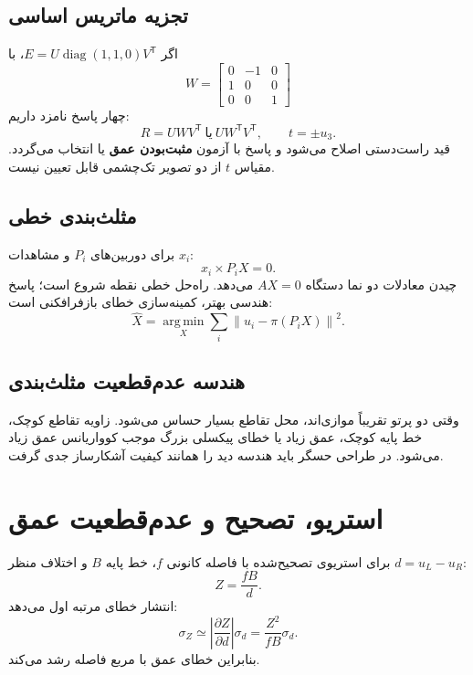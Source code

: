 \documentclass[12pt,openany,oneside]{book}
\newcommand{\norm}[1]{\left\lVert #1\right\rVert}
\newcommand{\trans}{^{\mathsf T}}
\newcommand{\argmin}{\operatorname*{arg\,min}}
\newcommand{\diag}{\operatorname{diag}}
\begin{document}
\subsection{تجزیه ماتریس اساسی}
اگر \(E=U\diag(1,1,0)V\trans\)، با
\begin{equation}
W=\begin{bmatrix}0&-1&0\\1&0&0\\0&0&1\end{bmatrix}
\end{equation}
چهار پاسخ نامزد داریم:
\begin{equation}
R=UWV\trans\ \text{یا}\ UW\trans V\trans,
\qquad
 t=\pm u_3.
\end{equation}
قید راست‌دستی اصلاح می‌شود و پاسخ با آزمون \textbf{مثبت‌بودن عمق} یا  انتخاب می‌گردد.
مقیاس \(t\) از دو تصویر تک‌چشمی قابل تعیین نیست.

\subsection{مثلث‌بندی خطی}
برای دوربین‌های \(P_i\) و مشاهدات \(x_i\):
\begin{equation}
x_i\times P_iX=0.
\end{equation}
چیدن معادلات دو نما دستگاه \(AX=0\) می‌دهد. راه‌حل خطی نقطه شروع است؛ پاسخ هندسی بهتر، کمینه‌سازی خطای بازفرافکنی است:
\begin{equation}
\widehat X=\argmin_X\sum_i\norm{u_i-\pi(P_iX)}^2.
\end{equation}

\subsection{هندسه عدم‌قطعیت مثلث‌بندی}
وقتی دو پرتو تقریباً موازی‌اند، محل تقاطع بسیار حساس می‌شود. زاویه تقاطع کوچک، خط پایه کوچک، عمق زیاد یا خطای پیکسلی
بزرگ موجب کوواریانس عمق زیاد می‌شود. در طراحی حسگر باید هندسه دید را همانند کیفیت آشکارساز جدی گرفت.

\section{استریو، تصحیح و عدم‌قطعیت عمق}

برای استریوی تصحیح‌شده با فاصله کانونی \(f\)، خط پایه \(B\) و اختلاف منظر \(d=u_L-u_R\):
\begin{equation}
Z=\frac{fB}{d}.
\label{eq:stereo-depth}
\end{equation}
انتشار خطای مرتبه اول می‌دهد:
\begin{equation}
\sigma_Z\simeq\left|\frac{\partial Z}{\partial d}\right|\sigma_d
=\frac{Z^2}{fB}\sigma_d.
\label{eq:depth-uncertainty}
\end{equation}
بنابراین خطای عمق با مربع فاصله رشد می‌کند.
\end{document}
